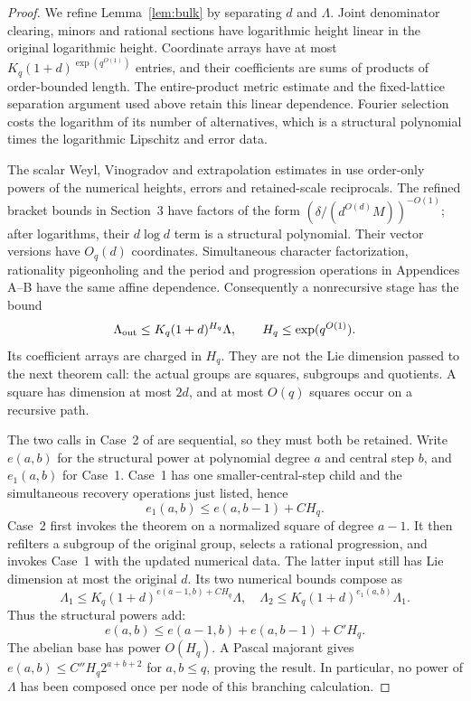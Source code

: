 \documentclass[11pt,a4paper]{article}
\theoremstyle{definition}
\begin{document}
\begin{proof}
We refine Lemma~\ref{lem:bulk} by separating \(d\) and
\(\Lambda\). Joint denominator clearing, minors and rational
sections have logarithmic height linear in the original logarithmic
height. Coordinate arrays have at most
\(K_q(1+d)^{\exp(q^{O(1)})}\) entries, and their coefficients
are sums of products of order-bounded length. The entire-product
metric estimate and the fixed-lattice separation argument used above
retain this linear dependence. Fourier selection costs the logarithm
of its number of alternatives, which is a structural polynomial times
the logarithmic Lipschitz and error data.

The scalar Weyl, Vinogradov and extrapolation estimates in
\cite[Appendix A]{leng} use order-only powers of the numerical
heights, errors and retained-scale reciprocals. The refined bracket
bounds in Section~3 have factors of the form
\((\delta/(d^{O(d)}M))^{-O(1)}\); after logarithms, their
\(d\log d\) term is a structural polynomial. Their vector
versions have \(O_q(d)\) coordinates. Simultaneous character
factorization, rationality pigeonholing and the period and progression
operations in Appendices A--B have the same affine dependence.
Consequently a nonrecursive stage has the bound
\[
 \Lambda_{\rm out}\le K_q(1+d)^{H_q}\Lambda,
 \qquad H_q\le\exp(q^{O(1)}).
\]
Its coefficient arrays are charged in \(H_q\). They are not the
Lie dimension passed to the next theorem call: the actual groups are
squares, subgroups and quotients. A square has dimension at most
\(2d\), and at most \(O(q)\) squares occur on a recursive path.

The two calls in Case~2 of \cite[Section~4]{leng} are sequential,
so they must both be retained. Write \(e(a,b)\) for the structural
power at polynomial degree \(a\) and central step \(b\), and
\(e_1(a,b)\) for Case~1. Case~1 has one smaller-central-step
child and the simultaneous recovery operations just listed, hence
\[
 e_1(a,b)\le e(a,b-1)+C H_q.
\]
Case~2 first invokes the theorem on a normalized square of degree
\(a-1\). It then refilters a subgroup of the original group,
selects a rational progression, and invokes Case~1 with the updated
numerical data. The latter input still has Lie dimension at most
the original \(d\). Its two numerical bounds compose as
\[
 \Lambda_1\le K_q(1+d)^{e(a-1,b)+CH_q}\Lambda,
 \quad
 \Lambda_2\le K_q(1+d)^{e_1(a,b)}\Lambda_1.
\]
Thus the structural powers add:
\[
 e(a,b)\le e(a-1,b)+e(a,b-1)+C'H_q.
\]
The abelian base has power \(O(H_q)\). A Pascal majorant gives
\(e(a,b)\le C''H_q2^{a+b+2}\) for \(a,b\le q\), proving
the result. In particular, no power of \(\Lambda\) has been
composed once per node of this branching calculation.
\end{proof}
\end{document}
